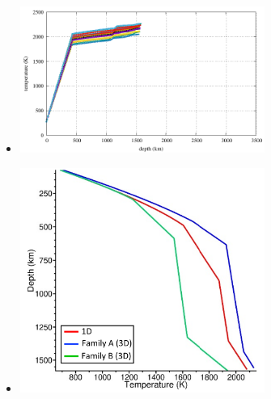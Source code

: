 \begin{itemize}
\item {}

\begin{center}
\includegraphics[width=8cm]{images/mars/density/khhd23/T.pdf}
\end{center}

\item {}

\begin{center}
\includegraphics[width=8cm]{images/mars/temperature/drsg24}
\end{center}

\end{itemize}
